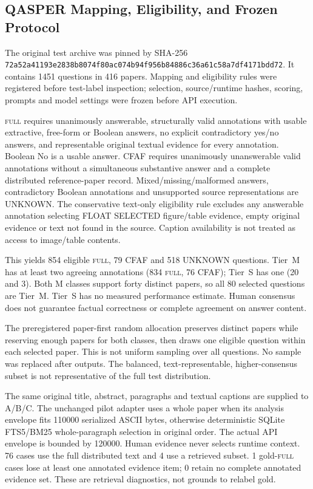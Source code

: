 \subsection{QASPER Mapping, Eligibility, and Frozen Protocol}

The original test archive was pinned by SHA-256 \texttt{72a52a41193e2838\allowbreak b8074f80ac074b94\allowbreak f956b84886c36a61\allowbreak c58a7df4171bdd72}. It contains 1451 questions in 416 papers. Mapping and eligibility rules were registered before test-label inspection; selection, source/runtime hashes, scoring, prompts and model settings were frozen before API execution.

\textsc{full} requires unanimously answerable, structurally valid annotations with usable extractive, free-form or Boolean answers, no explicit contradictory yes/no answers, and representable original textual evidence for every annotation. Boolean No is a usable answer. CFAF requires unanimously unanswerable valid annotations without a simultaneous substantive answer and a complete distributed reference-paper record. Mixed/missing/malformed answers, contradictory Boolean annotations and unsupported source representations are UNKNOWN. The conservative text-only eligibility rule excludes any answerable annotation selecting FLOAT SELECTED figure/table evidence, empty original evidence or text not found in the source. Caption availability is not treated as access to image/table contents.

This yields 854 eligible \textsc{full}, 79 CFAF and 518 UNKNOWN questions. Tier~M has at least two agreeing annotations (834 \textsc{full}, 76 CFAF); Tier~S has one (20 and 3). Both M classes support forty distinct papers, so all 80 selected questions are Tier~M. Tier~S has no measured performance estimate. Human consensus does not guarantee factual correctness or complete agreement on answer content.

The preregistered paper-first random allocation preserves distinct papers while reserving enough papers for both classes, then draws one eligible question within each selected paper. This is not uniform sampling over all questions. No sample was replaced after outputs. The balanced, text-representable, higher-consensus subset is not representative of the full test distribution.

The same original title, abstract, paragraphs and textual captions are supplied to A/B/C. The unchanged pilot adapter uses a whole paper when its analysis envelope fits 110000 serialized ASCII bytes, otherwise deterministic SQLite FTS5/BM25 whole-paragraph selection in original order. The actual API envelope is bounded by 120000. Human evidence never selects runtime context. 76 cases use the full distributed text and 4 use a retrieved subset. 1 gold-\textsc{full} cases lose at least one annotated evidence item; 0 retain no complete annotated evidence set. These are retrieval diagnostics, not grounds to relabel gold.

